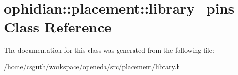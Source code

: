 \hypertarget{classophidian_1_1placement_1_1library__pins}{\section{ophidian\-:\-:placement\-:\-:library\-\_\-pins Class Reference}
\label{classophidian_1_1placement_1_1library__pins}
}


The documentation for this class was generated from the following file\-:\begin{DoxyCompactItemize}
\item 
/home/csguth/workspace/openeda/src/placement/library.\-h\end{DoxyCompactItemize}
